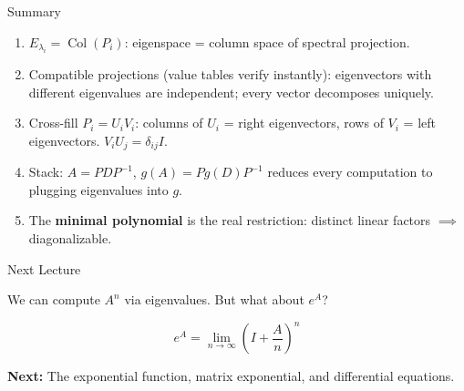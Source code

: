 \documentclass[10pt]{beamer}
\theoremstyle{definition}
\newcommand{\x}[1]{\alert{\textbf{#1}}}
\begin{document}
\begin{frame}[shrink=5]{Summary}

\begin{enumerate}
\item $E_{\lambda_i} = \operatorname{Col}(P_i)$: eigenspace = column space of spectral projection.

\vspace{4pt}

\item Compatible projections (value tables verify instantly):
eigenvectors with different eigenvalues are independent; every vector decomposes uniquely.

\vspace{4pt}

\item Cross-fill $P_i = U_i V_i$: columns of $U_i$ = right eigenvectors,
rows of $V_i$ = left eigenvectors. $V_i U_j = \delta_{ij} I$.

\vspace{4pt}

\item Stack: $A = PDP^{-1}$, \; $g(A) = Pg(D)P^{-1}$ reduces every computation to plugging eigenvalues into $g$.

\vspace{4pt}

\item The \x{minimal polynomial} is the real restriction: distinct linear factors $\implies$ diagonalizable.
\end{enumerate}

\end{frame}


\begin{frame}{Next Lecture}

\vfill

We can compute $A^n$ via eigenvalues. But what about $e^A$?

\vfill

$$e^A = \lim_{n \to \infty}\left(I + \frac{A}{n}\right)^n$$

\vfill

\x{Next:} The exponential function, matrix exponential, and differential equations.

\vfill

\end{frame}
\end{document}
